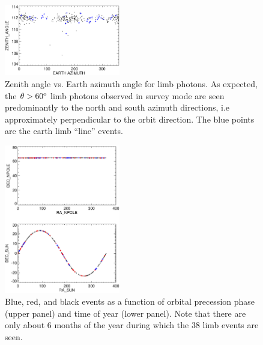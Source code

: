 \documentclass[aps,twocolumn,prd,superscriptaddress,showpacs,nofootinbib,fixfloat]{revtex4}
\newcommand{\degree}{^{\rm o}}
\begin{document}
\begin{figure}
  \centering
  \includegraphics[width=0.45\textwidth]{plots/earth-az.ps}
  \caption{Zenith angle vs. Earth azimuth angle for limb photons.  As
  expected, the $\theta > 60\degree$ limb photons observed in survey mode are
  seen predominantly to the north and south azimuth directions, i.e
  approximately perpendicular to the orbit direction. The blue points are the
  earth limb ``line'' events. }
  \label{fig:earth-az}
\end{figure}

\begin{figure}
  \centering
  \includegraphics[width=0.45\textwidth]{plots/sun.ps}
  \caption{Blue, red, and black events as a function of orbital precession
  phase (upper panel) and time of year (lower panel).  Note that there are
  only about 6 months of the year during which the 38 limb events are seen.}
  \label{fig:sun}
\end{figure}

 
\end{document}
